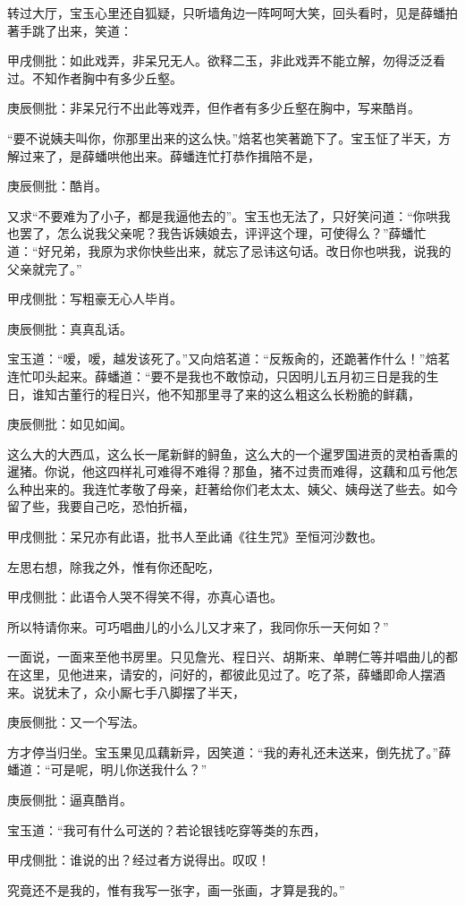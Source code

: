 \begin{parag}


    转过大厅，宝玉心里还自狐疑，只听墙角边一阵呵呵大笑，回头看时，见是薛蟠拍著手跳了出来，笑道：\begin{note}甲戌侧批：如此戏弄，非呆兄无人。欲释二玉，非此戏弄不能立解，勿得泛泛看过。不知作者胸中有多少丘壑。\end{note}\begin{note}庚辰侧批：非呆兄行不出此等戏弄，但作者有多少丘壑在胸中，写来酷肖。\end{note}“要不说姨夫叫你，你那里出来的这么快。”焙茗也笑著跪下了。宝玉怔了半天，方解过来了，是薛蟠哄他出来。薛蟠连忙打恭作揖陪不是，\begin{note}庚辰侧批：酷肖。\end{note}又求“不要难为了小子，都是我逼他去的”。宝玉也无法了，只好笑问道：“你哄我也罢了，怎么说我父亲呢？我告诉姨娘去，评评这个理，可使得么？”薛蟠忙道：“好兄弟，我原为求你快些出来，就忘了忌讳这句话。改日你也哄我，说我的父亲就完了。”\begin{note}甲戌侧批：写粗豪无心人毕肖。\end{note}\begin{note}庚辰侧批：真真乱话。\end{note}宝玉道：“嗳，嗳，越发该死了。”又向焙茗道：“反叛肏的，还跪著作什么！”焙茗连忙叩头起来。薛蟠道：“要不是我也不敢惊动，只因明儿五月初三日是我的生日，谁知古董行的程日兴，他不知那里寻了来的这么粗这么长粉脆的鲜藕，\begin{note}庚辰侧批：如见如闻。\end{note}这么大的大西瓜，这么长一尾新鲜的鲟鱼，这么大的一个暹罗国进贡的灵柏香熏的暹猪。你说，他这四样礼可难得不难得？那鱼，猪不过贵而难得，这藕和瓜亏他怎么种出来的。我连忙孝敬了母亲，赶著给你们老太太、姨父、姨母送了些去。如今留了些，我要自己吃，恐怕折福，\begin{note}甲戌侧批：呆兄亦有此语，批书人至此诵《往生咒》至恒河沙数也。\end{note}左思右想，除我之外，惟有你还配吃，\begin{note}甲戌侧批：此语令人哭不得笑不得，亦真心语也。\end{note}所以特请你来。可巧唱曲儿的小么儿又才来了，我同你乐一天何如？”
\end{parag}


\begin{parag}


    一面说，一面来至他书房里。只见詹光、程日兴、胡斯来、单聘仁等并唱曲儿的都在这里，见他进来，请安的，问好的，都彼此见过了。吃了茶，薛蟠即命人摆酒来。说犹未了，众小厮七手八脚摆了半天，\begin{note}庚辰侧批：又一个写法。\end{note}方才停当归坐。宝玉果见瓜藕新异，因笑道：“我的寿礼还未送来，倒先扰了。”薛蟠道：“可是呢，明儿你送我什么？”\begin{note}庚辰侧批：逼真酷肖。\end{note}宝玉道：“我可有什么可送的？若论银钱吃穿等类的东西，\begin{note}甲戌侧批：谁说的出？经过者方说得出。叹叹！\end{note}究竟还不是我的，惟有我写一张字，画一张画，才算是我的。”
\end{parag}



